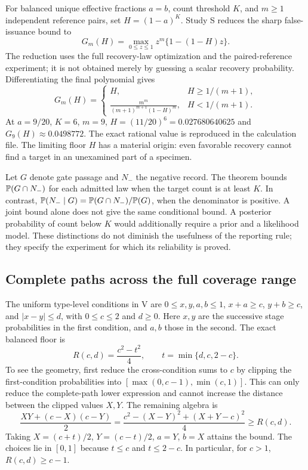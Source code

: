 For balanced unique effective fractions $a=b$, count threshold $K$, and $m\ge1$ independent reference pairs, set $H=(1-a)^K$. Study S reduces the sharp false-issuance bound to
\[
G_m(H)=\max_{0\le z\le1}z^m\{1-(1-H)z\}.
\]
The reduction uses the full recovery-law optimization and the paired-reference experiment; it is not obtained merely by guessing a scalar recovery probability. Differentiating the final polynomial gives
\[
G_m(H)=
\begin{cases}
H,&H\ge1/(m+1),\\[2pt]
\displaystyle\frac{m^m}{(m+1)^{m+1}(1-H)^m},&H<1/(m+1).
\end{cases}
\]
At $a=9/20$, $K=6$, $m=9$, $H=(11/20)^6=0.027680640625$ and $G_9(H)\approx0.0498772$. The exact rational value is reproduced in the calculation file. The limiting floor $H$ has a material origin: even favorable recovery cannot find a target in an unexamined part of a specimen.

Let $G$ denote gate passage and $N_-$ the negative record. The theorem bounds $\mathbb P(G\cap N_-)$ for each admitted law when the target count is at least $K$. In contrast, $\mathbb P(N_-\mid G)=\mathbb P(G\cap N_-)/\mathbb P(G)$, when the denominator is positive. A joint bound alone does not give the same conditional bound. A posterior probability of count below $K$ would additionally require a prior and a likelihood model. These distinctions do not diminish the usefulness of the reporting rule; they specify the experiment for which its reliability is proved.

\subsection{Complete paths across the full coverage range}\label{app:paths}
The uniform type-level conditions in V are $0\le x,y,a,b\le1$, $x+a\ge c$, $y+b\ge c$, and $|x-y|\le d$, with $0\le c\le2$ and $d\ge0$. Here $x,y$ are the successive stage probabilities in the first condition, and $a,b$ those in the second. The exact balanced floor is
\[
R(c,d)=\frac{c^2-t^2}{4},\qquad t=\min\{d,c,2-c\}.
\]
To see the geometry, first reduce the cross-condition sums to $c$ by clipping the first-condition probabilities into $[\max(0,c-1),\min(c,1)]$. This can only reduce the complete-path lower expression and cannot increase the distance between the clipped values $X,Y$. The remaining algebra is
\[
\frac{XY+(c-X)(c-Y)}2
=\frac{c^2-(X-Y)^2+(X+Y-c)^2}{4}\ge R(c,d).
\]
Taking $X=(c+t)/2$, $Y=(c-t)/2$, $a=Y$, $b=X$ attains the bound. The choices lie in $[0,1]$ because $t\le c$ and $t\le2-c$. In particular, for $c>1$, $R(c,d)\ge c-1$.

